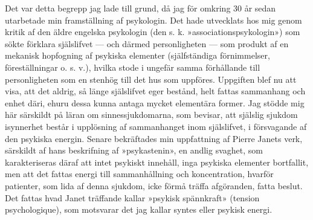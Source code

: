 \documentclass[12pt]{article}
\newcommand{\opage}[1]{\marginnote{\footnotesize\textit{[#1]}}}
\begin{document}
Det var detta begrepp jag lade till grund, då jag för omkring 30 år sedan utarbetade min framställning af psykologin. Det hade utvecklats hos mig %
\opage{30}
genom kritik af den äldre engelska psykologin (den s. k. »associationspsykologin») som sökte förklara själslifvet --- och därmed personligheten --- som produkt af en mekanisk hopfogning af psykiska elementer (själfständiga förnimmelser, föreställningar o. s. v.), hvilka stode i ungefär samma förhållande till personligheten som en stenhög till det hus som uppföres. Uppgiften blef nu att visa, att det aldrig, så länge själslifvet eger bestånd, helt fattas sammanhang och enhet däri, ehuru dessa kunna antaga mycket elementära former. Jag stödde mig här särskildt på läran om sinnessjukdomarna, som bevisar, att själslig sjukdom isynnerhet består i upplösning af sammanhanget inom själslifvet, i försvagande af den psykiska energin. Senare bekräftades min uppfattning af Pierre Janets verk, särskildt af hans beskrifning af »psykastenin», en andlig svaghet, som karakteriseras däraf att intet psykiskt innehåll, inga psykiska elementer bortfallit, men att det fattas energi till sammanhållning och koncentration, hvarför patienter, som lida af denna sjukdom, icke förmå träffa afgöranden, fatta beslut. Det fattas hvad Janet träffande kallar »psykisk spännkraft» %
\opage{31}
(tension psychologique), som motsvarar det jag kallar syntes eller psykisk energi.
\end{document}
